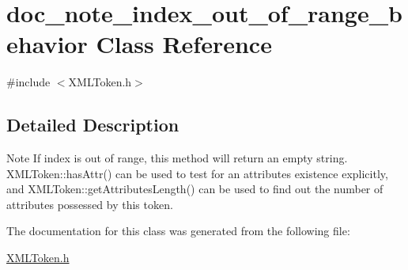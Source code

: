 \hypertarget{classdoc__note__index__out__of__range__behavior}{}\section{doc\+\_\+note\+\_\+index\+\_\+out\+\_\+of\+\_\+range\+\_\+behavior Class Reference}
\label{classdoc__note__index__out__of__range__behavior}


{\ttfamily \#include $<$X\+M\+L\+Token.\+h$>$}



\subsection{Detailed Description}
\begin{DoxyNote}{Note}
If {\ttfamily index} is out of range, this method will return an empty string. X\+M\+L\+Token\+::has\+Attr() can be used to test for an attribute\textquotesingle{}s existence explicitly, and X\+M\+L\+Token\+::get\+Attributes\+Length() can be used to find out the number of attributes possessed by this token. 
\end{DoxyNote}


The documentation for this class was generated from the following file\+:\begin{DoxyCompactItemize}
\item 
\hyperlink{_x_m_l_token_8h}{X\+M\+L\+Token.\+h}\end{DoxyCompactItemize}

